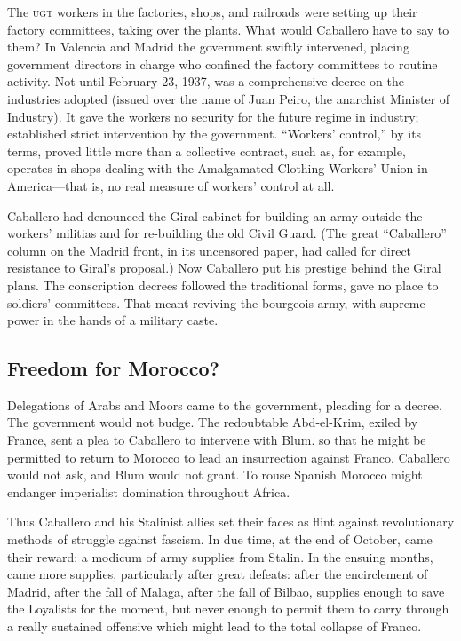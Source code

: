 The \textsc{ugt} workers in the factories, shops, and railroads were setting up their factory committees, taking over the plants. What would Caballero have to say to them? In Valencia and Madrid the government swiftly intervened, placing government directors in charge who confined the factory committees to routine activity. Not until February 23, 1937, was a comprehensive decree on the industries adopted (issued over the name of Juan Peiro, the anarchist Minister of Industry). It gave the workers no security for the future regime in industry; established strict intervention by the government. ``Workers’ control,'' by its terms, proved little more than a collective contract, such as, for example, operates in shops dealing with the {Amalgamated Clothing Workers’ Union} in America---that is, no real measure of workers’ control at all.

Caballero had denounced the Giral cabinet for building an army outside the workers’ militias and for re-building the old Civil Guard. (The great ``Caballero'' column on the Madrid front, in its uncensored paper, had called for direct resistance to Giral’s proposal.) Now Caballero put his prestige behind the Giral plans. The conscription decrees followed the traditional forms, gave no place to soldiers’ committees. That meant reviving the bourgeois army, with supreme power in the hands of a military caste.

\subsection*{Freedom for Morocco?}

Delegations of Arabs and Moors came to the government, pleading for a decree. The government would not budge. The redoubtable Abd-el-Krim, exiled by France, sent a plea to Caballero to intervene with Blum. so that he might be permitted to return to Morocco to lead an insurrection against Franco. Caballero would not ask, and Blum would not grant. To rouse Spanish Morocco might endanger imperialist domination throughout Africa.
\nowidow

Thus Caballero and his Stalinist allies set their faces as flint against revolutionary methods of struggle against fascism. In due time, at the end of October, came their reward: a modicum of army supplies from Stalin. In the ensuing months, came more supplies, particularly after great defeats: after the encirclement of Madrid, after the fall of Malaga, after the fall of Bilbao, supplies enough to save the Loyalists for the moment, but never enough to permit them to carry through a really sustained offensive which might lead to the total collapse of Franco.

